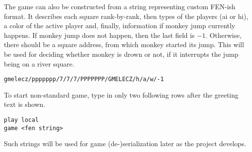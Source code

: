 The game can also be constructed from a string representing custom FEN-ish
format. It describes each square rank-by-rank, then types of the players (ai
or hi), a color of the active player and, finally, information if monkey jump
currently happens. If monkey jump does not happen, then the last field is
$-1$. Otherwise, there should be a square address, from which monkey started
its jump. This will be used for deciding whether monkey is drown or not, if it
interrupts the jump being on a river square.
\begin{verbatim}
gmelecz/ppppppp/7/7/7/PPPPPPP/GMELECZ/h/a/w/-1
\end{verbatim}

To start non-standard game, type in only two following rows after the greeting
text is shown.
\begin{verbatim}
play local
game <fen string>
\end{verbatim}

Such strings will be used for game (de-)serialization later as the project
develops.
